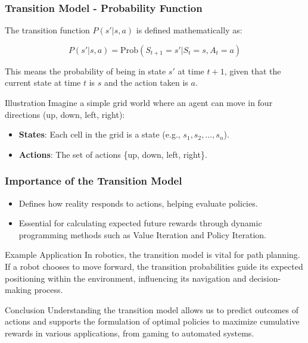 \documentclass[aspectratio=169]{beamer}
\begin{document}
\begin{frame}[fragile]
    \frametitle{Transition Model - Probability Function}
    The transition function \( P(s' | s, a) \) is defined mathematically as:

    \begin{equation}
        P(s' | s, a) = \text{Prob}(S_{t+1} = s' | S_t = s, A_t = a)
    \end{equation}
    
    This means the probability of being in state \( s' \) at time \( t+1 \), given that the current state at time \( t \) is \( s \) and the action taken is \( a \).

    \begin{block}{Illustration}
        Imagine a simple grid world where an agent can move in four directions (up, down, left, right):
        \begin{itemize}
            \item \textbf{States}: Each cell in the grid is a state (e.g., \( s_1, s_2, \ldots, s_n \)).
            \item \textbf{Actions}: The set of actions \{up, down, left, right\}.
        \end{itemize}
    \end{block}
\end{frame}

\begin{frame}[fragile]
    \frametitle{Importance of the Transition Model}
    \begin{itemize}
        \item Defines how reality responds to actions, helping evaluate policies.
        \item Essential for calculating expected future rewards through dynamic programming methods such as Value Iteration and Policy Iteration.
    \end{itemize}
    
    \begin{block}{Example Application}
        In robotics, the transition model is vital for path planning. If a robot chooses to move forward, the transition probabilities guide its expected positioning within the environment, influencing its navigation and decision-making process.
    \end{block}
    
    \begin{block}{Conclusion}
        Understanding the transition model allows us to predict outcomes of actions and supports the formulation of optimal policies to maximize cumulative rewards in various applications, from gaming to automated systems.
    \end{block}
\end{frame}
\end{document}
